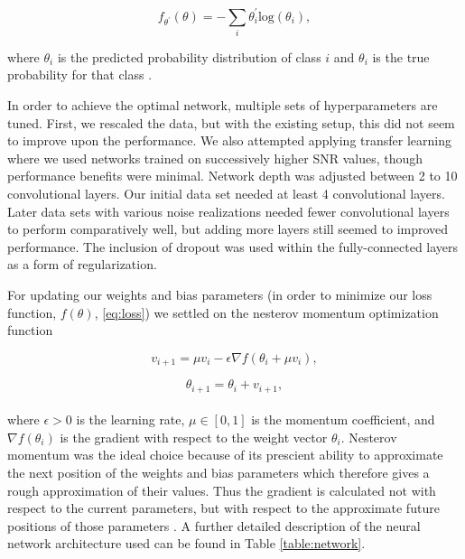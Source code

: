 \documentclass[%
 amsmath,amssymb,
 aps,
 twocolumn,
 prl,
 reprint,
floatfix,
]{revtex4-1}
\begin{document}
\begin{equation} \label{eq:loss}
f_{\theta^{'}}(\theta) = -\sum_{i} \theta_{i}^{'} \mathrm{log}(\theta_{i}),
\end{equation}

where $\theta_{i}$ is the predicted probability distribution of class $i$ and
$\theta_{i}$ is the true probability for that class
\cite{tensorflow2015-whitepaper}. 

In order to achieve the optimal network, multiple sets of hyperparameters are
tuned. First, we rescaled the data, but with the existing setup, this did not
seem to improve upon the performance. We also attempted applying transfer
learning where we used networks trained on successively higher SNR values,
though performance benefits were minimal. Network depth was adjusted between 2
to 10 convolutional layers. Our initial data set needed at least 4
convolutional layers. Later data sets with various noise realizations needed
fewer convolutional layers to perform comparatively well, but adding more
layers still seemed to improved performance. The inclusion of dropout was used
within the fully-connected layers as a form of regularization.

For updating our weights and bias parameters (in order to minimize our loss
function, $f(\theta)$, \eqref{eq:loss}) we settled on the nesterov momentum
optimization function

\begin{equation} \label{eq:nesterov1}
v_{i+1} = \mu v_{i} - \epsilon \nabla f(\theta_{i} + \mu v_{i}),
\end{equation}

\begin{equation} \label{eq:nesterov2}
\theta_{i+1} = \theta_{i} + v_{i+1},
\end{equation} \\

where $\epsilon > 0$ is the learning rate, $\mu \in [0,1]$ is the momentum
coefficient, and $\nabla f(\theta_{i})$ is the gradient with respect to the
weight vector $\theta_{i}$. Nesterov momentum was the ideal choice because of
its prescient ability to approximate the next position of the weights and bias
parameters which therefore gives a rough approximation of their values. Thus
the gradient is calculated not with respect to the current parameters, but with
respect to the approximate future positions of those parameters
\cite{Sutskever:2013:IIM:3042817.3043064}. A further detailed description of
the neural network architecture used can be found in Table \ref{table:network}.
\end{document}
